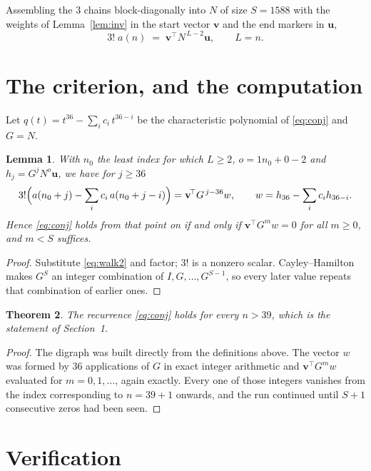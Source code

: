\documentclass[11pt,a4paper]{article}
\theoremstyle{plain}
\newtheorem{theorem}{Theorem}
\newtheorem{lemma}[theorem]{Lemma}
\theoremstyle{definition}
\begin{document}
Assembling the $3$ chains block-diagonally into $N$ of size $S=1588$ with the weights of
Lemma~\ref{lem:inv} in the start vector $\mathbf{v}$ and the end markers in
$\mathbf{u}$,
\begin{equation}\label{eq:walk2}
3!\;a(n)\;=\;\mathbf{v}^{\!\top}N^{\,L-2}\mathbf{u},\qquad L=n .
\end{equation}

\section{The criterion, and the computation}

Let $q(t)=t^{36}-\sum_i c_i\,t^{36-i}$ be the characteristic polynomial of
\eqref{eq:conj} and $G=N$.

\begin{lemma}\label{lem:crit}
With $n_0$ the least index for which $L\ge2$, $o=1n_0+0-2$ and
$h_j=G^{j}N^{o}\mathbf{u}$, we have for $j\ge36$
\[
3!\Bigl(a(n_0+j)-\sum_i c_i\,a(n_0+j-i)\Bigr)=\mathbf{v}^{\!\top}G^{\,j-36}w,
\qquad w=h_{36}-\sum_i c_i h_{36-i} .
\]
Hence \eqref{eq:conj} holds from that point on if and only if
$\mathbf{v}^{\!\top}G^{m}w=0$ for all $m\ge0$, and $m<S$ suffices.
\end{lemma}

\begin{proof}
Substitute \eqref{eq:walk2} and factor; $3!$ is a nonzero scalar. Cayley--Hamilton
makes $G^{S}$ an integer combination of $I,G,\dots,G^{S-1}$, so every later value repeats
that combination of earlier ones.
\end{proof}

\begin{theorem}
The recurrence \eqref{eq:conj} holds for every $n>39$, which is the statement of
Section~1.
\end{theorem}

\begin{proof}
The digraph was built directly from the definitions above. The vector $w$ was formed by
$36$ applications of $G$ in exact integer arithmetic and $\mathbf{v}^{\!\top}G^{m}w$
evaluated for $m=0,1,\dots$, again exactly. Every one of those integers vanishes from the
index corresponding to $n=39+1$ onwards, and the run continued until $S+1$ consecutive
zeros had been seen.
\end{proof}

\section{Verification}
\end{document}
